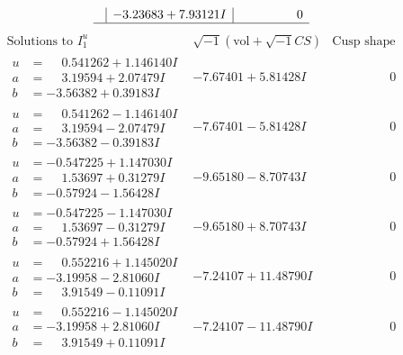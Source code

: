 \documentclass[1p]{elsarticle_modified}
\theoremstyle{definition}
\newcommand{\I}{\sqrt{-1}}
\begin{document}
$$\begin{array}{c|c|c}
 & -3.23683 + 7.93121 I & \phantom{-0.000000 } 0\\
 \hline 
 \end{array}$$\newpage$$\begin{array}{c|c|c}  
\text{Solutions to }I^u_{1}& \I (\text{vol} + \sqrt{-1}CS) & \text{Cusp shape}\\
 \hline 
\begin{aligned}
u &= \phantom{-}0.541262 + 1.146140 I \\
a &= \phantom{-}3.19594 + 2.07479 I \\
b &= -3.56382 + 0.39183 I\end{aligned}
 & -7.67401 + 5.81428 I & \phantom{-0.000000 } 0 \\ \hline\begin{aligned}
u &= \phantom{-}0.541262 - 1.146140 I \\
a &= \phantom{-}3.19594 - 2.07479 I \\
b &= -3.56382 - 0.39183 I\end{aligned}
 & -7.67401 - 5.81428 I & \phantom{-0.000000 } 0 \\ \hline\begin{aligned}
u &= -0.547225 + 1.147030 I \\
a &= \phantom{-}1.53697 + 0.31279 I \\
b &= -0.57924 - 1.56428 I\end{aligned}
 & -9.65180 - 8.70743 I & \phantom{-0.000000 } 0 \\ \hline\begin{aligned}
u &= -0.547225 - 1.147030 I \\
a &= \phantom{-}1.53697 - 0.31279 I \\
b &= -0.57924 + 1.56428 I\end{aligned}
 & -9.65180 + 8.70743 I & \phantom{-0.000000 } 0 \\ \hline\begin{aligned}
u &= \phantom{-}0.552216 + 1.145020 I \\
a &= -3.19958 - 2.81060 I \\
b &= \phantom{-}3.91549 - 0.11091 I\end{aligned}
 & -7.24107 + 11.48790 I & \phantom{-0.000000 } 0 \\ \hline\begin{aligned}
u &= \phantom{-}0.552216 - 1.145020 I \\
a &= -3.19958 + 2.81060 I \\
b &= \phantom{-}3.91549 + 0.11091 I\end{aligned}
 & -7.24107 - 11.48790 I & \phantom{-0.000000 } 0 \\ \hline\begin{aligned}

\end{aligned}
\end{array}$$
\end{document}

